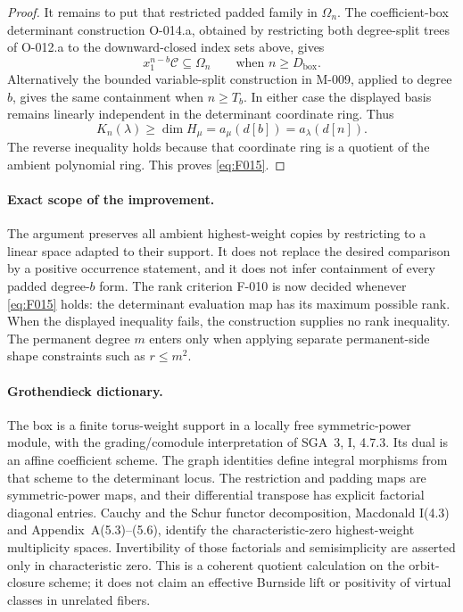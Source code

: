 \begin{proof}
It remains to put that restricted padded family in \(\Omega_n\).
The coefficient-box determinant construction O-014.a, obtained
by restricting both degree-split trees of O-012.a to the
downward-closed index sets above, gives
\[
           x_1^{n-b}\mathcal C\subseteq\Omega_n
                    \qquad\text{when }n\geq D_{\mathrm{box}}.
\]
Alternatively the bounded variable-split construction in M-009,
applied to degree \(b\), gives the same containment when
\(n\geq T_b\). In either case the displayed basis remains
linearly independent in the determinant coordinate ring.
Thus
\[
 K_n(\lambda)\geq\dim H_\mu
       =a_\mu(d[b])=a_\lambda(d[n]).
\]
The reverse inequality holds because that coordinate ring is
a quotient of the ambient polynomial ring. This proves
\eqref{eq:F015}.
\end{proof}

\paragraph{Exact scope of the improvement.}
The argument preserves all ambient highest-weight copies by
restricting to a linear space adapted to their support. It does
not replace the desired comparison by a positive occurrence
statement, and it does not infer containment of every padded
degree-\(b\) form. The rank criterion F-010 is now decided
whenever \eqref{eq:F015} holds: the determinant evaluation map
has its maximum possible rank. When the displayed inequality
fails, the construction supplies no rank inequality.
The permanent degree \(m\) enters only when applying separate
permanent-side shape constraints such as \(r\leq m^2\).

\paragraph{Grothendieck dictionary.}
The box is a finite torus-weight support in a locally free
symmetric-power module, with the grading/comodule interpretation
of SGA~3, I, 4.7.3. Its dual is an affine coefficient scheme.
The graph identities define integral morphisms from that scheme
to the determinant locus. The restriction and padding maps are
symmetric-power maps, and their differential transpose has
explicit factorial diagonal entries. Cauchy and the Schur
functor decomposition, Macdonald I(4.3) and Appendix~A(5.3)--(5.6),
identify the characteristic-zero highest-weight multiplicity
spaces. Invertibility of those factorials and semisimplicity
are asserted only in characteristic zero. This is a coherent
quotient calculation on the orbit-closure scheme; it does not
claim an effective Burnside lift or positivity of virtual
classes in unrelated fibers.
